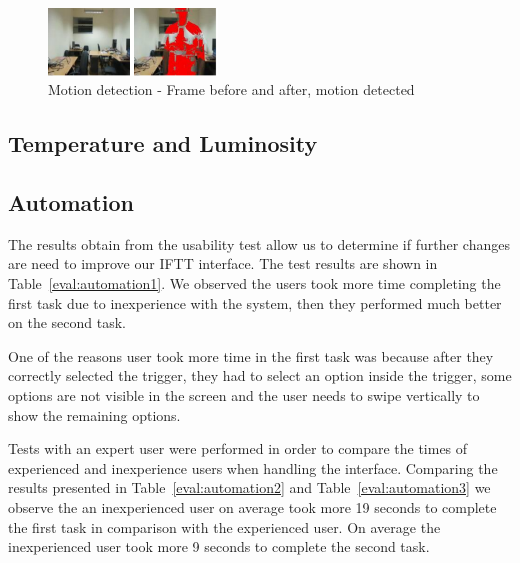 \begin{figure}[h]
\centering
\includegraphics[width=0.4\textwidth]{Figures/eval_motion}
\caption{Motion detection - Frame before and after, motion detected }
\label{eval:motion_fig}
\end{figure}



\subsection{Temperature and Luminosity}











\subsection{Automation}

The results obtain from the usability test allow us to determine if further changes are need to improve our \ac{IFTT} interface. The test results are shown in  Table~\ref{eval:automation1}. We observed the users took more time completing the first task due to inexperience with the system, then they performed much better on the second task. 

One of the reasons user took more time in the first task was because after they correctly selected the trigger, they had to select an option inside the trigger, some options are not visible in the screen and the user needs to swipe vertically to show the remaining options.

Tests with an expert user were performed in order to compare the times of experienced and inexperience users when handling the interface. Comparing the results presented in Table~\ref{eval:automation2} and Table~\ref{eval:automation3} we observe the an inexperienced user on average took more 19 seconds to complete the first task in comparison with the experienced user. On average the inexperienced user took more 9 seconds to complete the second task.


